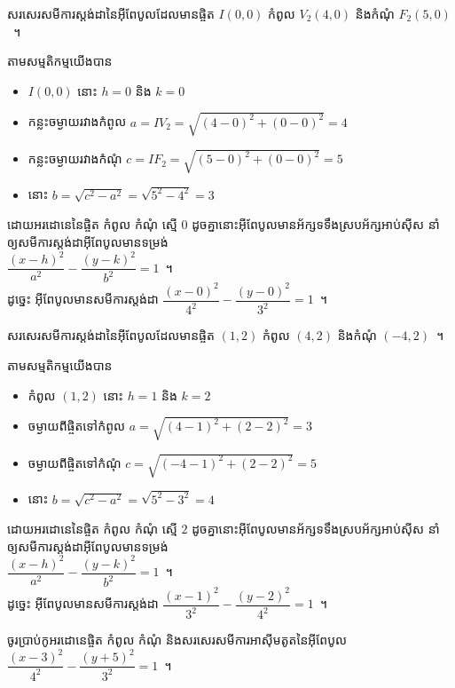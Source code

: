 %
\begin{example*}
	សរសេរសមីការស្តង់ដានៃអ៊ីពែបូលដែលមានផ្ចិត $ I(0,0) $ កំពូល $ V_2(4,0) $ និងកំណុំ $ F_2(5,0) $~។
\end{example*}
%
\begin{answer}
	តាមសម្មតិកម្មយើងបាន
	\begin{itemize}
		\item $ I(0,0) $ នោះ $ h=0 $ និង $ k=0 $
		\item កន្លះចម្ងាយរវាងកំពូល $ a=IV_2=\sqrt{(4-0)^2+(0-0)^2}=4 $
		\item កន្លះចម្ងាយរវាងកំណុំ $ c=IF_2=\sqrt{(5-0)^2+(0-0)^2}=5 $
		\item នោះ $ b=\sqrt{c^2-a^2}=\sqrt{5^2-4^2}=3 $
	\end{itemize}
	ដោយអរដោនេនៃផ្ចិត កំពូល កំណុំ ស្មើ $ 0 $ ដូចគ្នានោះអ៊ីពែបូលមានអ័ក្សទទឹងស្របអ័ក្សអាប់ស៊ីស នាំឲ្យសមីការស្តង់ដាអ៊ីពែបូលមានទម្រង់\\ $ \dfrac{(x-h)^2}{a^2}-\dfrac{(y-k)^2}{b^2}=1 $~។\\ ដូច្នេះ អ៊ីពែបូលមានសមីការស្តង់ដា $ \dfrac{(x-0)^2}{4^2}-\dfrac{(y-0)^2}{3^2}=1 $~។
\end{answer}
%
\begin{example*}
	សរសេរសមីការស្តង់ដានៃអ៊ីពែបូលដែលមានផ្ចិត $ (1,2) $ កំពូល $ (4,2) $ និងកំណុំ $ (-4,2) $~។
\end{example*}
%
\begin{answer}
	តាមសម្មតិកម្មយើងបាន
	\begin{itemize}
		\item កំពូល $ (1,2) $ នោះ $ h=1 $ និង $ k=2 $
		\item ចម្ងាយពីផ្ចិតទៅកំពូល $ a=\sqrt{(4-1)^2+(2-2)^2}=3 $
		\item ចម្ងាយពីផ្ចិតទៅកំណុំ $ c=\sqrt{(-4-1)^2+(2-2)^2}=5 $
		\item នោះ $ b=\sqrt{c^2-a^2}=\sqrt{5^2-3^2}=4 $
	\end{itemize}
	ដោយអរដោនេនៃផ្ចិត កំពូល កំណុំ ស្មើ $ 2 $ ដូចគ្នានោះអ៊ីពែបូលមានអ័ក្សទទឹងស្របអ័ក្សអាប់ស៊ីស នាំឲ្យសមីការស្តង់ដាអ៊ីពែបូលមានទម្រង់\\ $ \dfrac{(x-h)^2}{a^2}-\dfrac{(y-k)^2}{b^2}=1 $~។\\ ដូច្នេះ អ៊ីពែបូលមានសមីការស្តង់ដា $ \dfrac{(x-1)^2}{3^2}-\dfrac{(y-2)^2}{4^2}=1 $~។
\end{answer}
%
\begin{example*}
	ចូរប្រាប់កូអរដោនេផ្ចិត កំពូល កំណុំ និងសរសេរសមីការអាស៊ីមតូតនៃអ៊ីពែបូល $ \dfrac{(x-3)^2}{4^2}-\dfrac{(y+5)^2}{3^2}=1 $~។
\end{example*}
%
